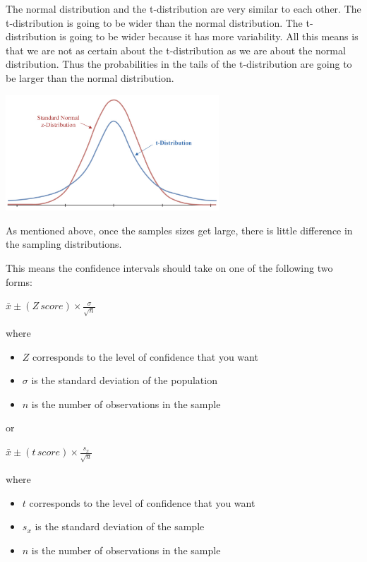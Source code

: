 \documentclass[
  letterpaper,
  DIV=11,
  numbers=noendperiod]{scrreprt}
\providecommand{\tightlist}{%
  \setlength{\itemsep}{0pt}\setlength{\parskip}{0pt}}\usepackage{longtable,booktabs,array}
\begin{document}
The normal distribution and the t-distribution are very similar to each
other. The t-distribution is going to be wider than the normal
distribution. The t-distribution is going to be wider because it has
more variability. All this means is that we are not as certain about the
t-distribution as we are about the normal distribution. Thus the
probabilities in the tails of the t-distribution are going to be larger
than the normal distribution.

\includegraphics[width=0.6\textwidth,height=\textheight]{./images/EPCI_8.jpg}

As mentioned above, once the samples sizes get large, there is little
difference in the sampling distributions.

This means the confidence intervals should take on one of the following
two forms:

\(\displaystyle{\bar{x} \pm (Z\,score) \times \frac{\sigma}{\sqrt{n}}}\)

where

\begin{itemize}
\tightlist
\item
  \(Z\) corresponds to the level of confidence that you want
\item
  \(\sigma\) is the standard deviation of the population
\item
  \(n\) is the number of observations in the sample
\end{itemize}

or

\(\displaystyle{\bar{x} \pm (t \, score) \times \frac{s_x}{\sqrt{n}}}\)

where

\begin{itemize}
\tightlist
\item
  \(t\) corresponds to the level of confidence that you want
\item
  \(s_x\) is the standard deviation of the sample
\item
  \(n\) is the number of observations in the sample
\end{itemize}
\end{document}
